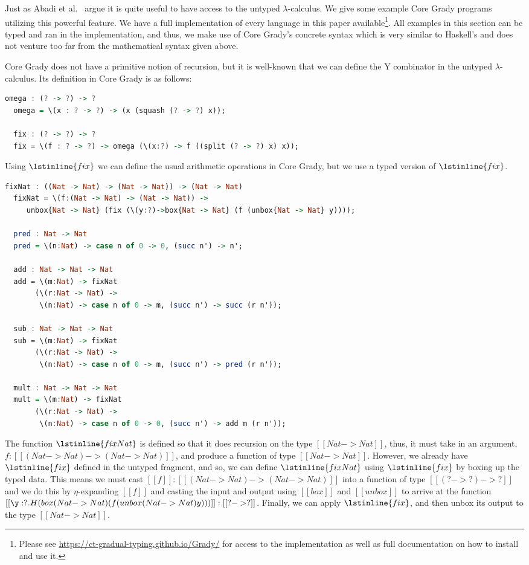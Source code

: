 Just as Abadi et al.~\cite{Abadi:1989} argue it is quite useful to
have access to the untyped $\lambda$-calculus.  We give some example
Core Grady programs utilizing this powerful feature.  We have a full
implementation of every language in this paper
available\footnote{Please see
  \url{https://ct-gradual-typing.github.io/Grady/} for access to the
  implementation as well as full documentation on how to install and
  use it.}.  All examples in this section can be typed and ran in the
implementation, and thus, we make use of Core Grady's concrete syntax
which is very similar to Haskell's and does not venture too far from
the mathematical syntax given above.

Core Grady does not have a primitive notion of recursion, but it is
well-known that we can define the Y combinator in the untyped
$\lambda$-calculus.  Its definition in Core Grady is as follows:
\begin{lstlisting}[language=Haskell]
  omega : (? -> ?) -> ?
  omega = \(x : ? -> ?) -> (x (squash (? -> ?) x));
  
  fix : (? -> ?) -> ?
  fix = \(f : ? -> ?) -> omega (\(x:?) -> f ((split (? -> ?) x) x));
\end{lstlisting}
Using $\lstinline{fix}$ we can define the usual arithmetic operations
in Core Grady, but we use a typed version of $\lstinline{fix}$.
\begin{lstlisting}[language=Haskell]
  fixNat : ((Nat -> Nat) -> (Nat -> Nat)) -> (Nat -> Nat)
  fixNat = \(f:(Nat -> Nat) -> (Nat -> Nat)) ->
     unbox{Nat -> Nat} (fix (\(y:?)->box{Nat -> Nat} (f (unbox{Nat -> Nat} y))));
  
  pred : Nat -> Nat
  pred = \(n:Nat) -> case n of 0 -> 0, (succ n') -> n';

  add : Nat -> Nat -> Nat
  add = \(m:Nat) -> fixNat
       (\(r:Nat -> Nat) ->
        \(n:Nat) -> case n of 0 -> m, (succ n') -> succ (r n'));

  sub : Nat -> Nat -> Nat
  sub = \(m:Nat) -> fixNat
       (\(r:Nat -> Nat) ->
        \(n:Nat) -> case n of 0 -> m, (succ n') -> pred (r n'));        
        
  mult : Nat -> Nat -> Nat
  mult = \(m:Nat) -> fixNat
       (\(r:Nat -> Nat) ->
        \(n:Nat) -> case n of 0 -> 0, (succ n') -> add m (r n'));
\end{lstlisting}
The function $\lstinline{fixNat}$ is defined so that it does recursion
on the type $[[Nat -> Nat]]$, thus, it must take in an argument,
$f : [[(Nat -> Nat) -> (Nat -> Nat)]]$, and
produce a function of type $[[Nat -> Nat]]$.  However, we
already have $\lstinline{fix}$ defined in the untyped fragment, and
so, we can define $\lstinline{fixNat}$ using $\lstinline{fix}$ by
boxing up the typed data.  This means we must cast $[[f]] : [[(Nat -> Nat) -> (Nat -> Nat)]]$ into a function of type
$[[(? -> ?) -> ?]]$ and we do this by $\eta$-expanding
$[[f]]$ and casting the input and output using $[[box]]$ and
$[[unbox]]$ to arrive at the function
$[[\y:?.H(box (Nat -> Nat) (f (unbox (Nat -> Nat) y)))]] : [[? -> ?]]$.  Finally, we can apply $\lstinline{fix}$, and then unbox its output to the type $[[Nat -> Nat]]$.

